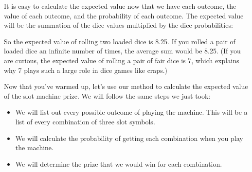 \documentclass[
  letterpaper,
  DIV=11,
  numbers=noendperiod]{scrbook}
\newenvironment{Shaded}{\begin{snugshade}}{\end{snugshade}}
\newcommand{\DecValTok}[1]{\textcolor[rgb]{0.68,0.00,0.00}{#1}}
\newcommand{\DocumentationTok}[1]{\textcolor[rgb]{0.37,0.37,0.37}{\textit{#1}}}
\newcommand{\FunctionTok}[1]{\textcolor[rgb]{0.28,0.35,0.67}{#1}}
\newcommand{\NormalTok}[1]{\textcolor[rgb]{0.00,0.23,0.31}{#1}}
\newcommand{\OtherTok}[1]{\textcolor[rgb]{0.00,0.23,0.31}{#1}}
\newcommand{\SpecialCharTok}[1]{\textcolor[rgb]{0.37,0.37,0.37}{#1}}
\providecommand{\tightlist}{%
  \setlength{\itemsep}{0pt}\setlength{\parskip}{0pt}}
\begin{document}
\begin{Shaded}
\end{Shaded}

It is easy to calculate the expected value now that we have each
outcome, the value of each outcome, and the probability of each outcome.
The expected value will be the summation of the dice values multiplied
by the dice probabilities:

\begin{Shaded}
\end{Shaded}

So the expected value of rolling two loaded dice is 8.25. If you rolled
a pair of loaded dice an infinite number of times, the average sum would
be 8.25. (If you are curious, the expected value of rolling a pair of
fair dice is 7, which explains why 7 plays such a large role in dice
games like craps.)

Now that you've warmed up, let's use our method to calculate the
expected value of the slot machine prize. We will follow the same steps
we just took:

\begin{itemize}
\tightlist
\item
  We will list out every possible outcome of playing the machine. This
  will be a list of every combination of three slot symbols.
\item
  We will calculate the probability of getting each combination when you
  play the machine.
\item
  We will determine the prize that we would win for each combination.
\end{itemize}
\end{document}

